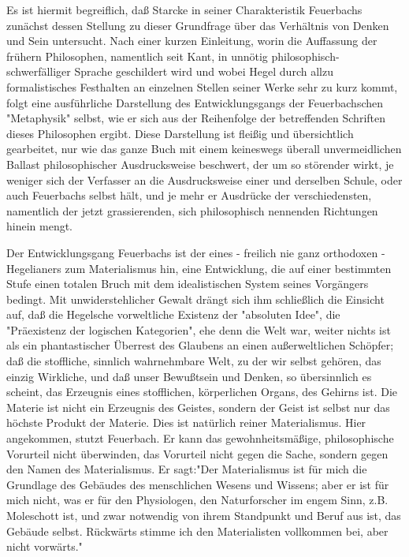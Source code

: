 Es ist hiermit begreiflich, daß Starcke in seiner Charakteristik
Feuerbachs zunächst dessen Stellung zu dieser Grundfrage über das
Verhältnis von Denken und Sein untersucht. Nach einer kurzen Einleitung,
worin die Auffassung der frühern Philosophen, namentlich seit Kant, in
unnötig philosophisch-schwerfälliger Sprache geschildert wird und wobei
Hegel durch allzu formalistisches Festhalten an einzelnen Stellen seiner
Werke sehr zu kurz kommt, folgt eine ausführliche Darstellung des
Entwicklungsgangs der Feuerbachschen "Metaphysik" selbst, wie er sich
aus der Reihenfolge der betreffenden Schriften dieses Philosophen
ergibt. Diese Darstellung ist fleißig und übersichtlich gearbeitet, nur
wie das ganze Buch mit einem keineswegs überall unvermeidlichen Ballast
philosophischer Ausdrucksweise beschwert, der um so störender wirkt, je
weniger sich der Verfasser an die Ausdrucksweise einer und derselben
Schule, oder auch Feuerbachs selbst hält, und je mehr er Ausdrücke der
verschiedensten, namentlich der jetzt grassierenden, sich philosophisch
nennenden Richtungen hinein mengt.

Der Entwicklungsgang Feuerbachs ist der eines - freilich nie
ganz orthodoxen - Hegelianers zum Materialismus hin, eine Entwicklung,
die auf einer bestimmten Stufe einen totalen Bruch mit dem
idealistischen System seines Vorgängers bedingt. Mit unwiderstehlicher
Gewalt drängt sich ihm schließlich die Einsicht auf, daß die Hegelsche
vorweltliche Existenz der "absoluten Idee", die "Präexistenz der
logischen Kategorien", ehe denn die Welt war, weiter nichts ist als ein
phantastischer Überrest des Glaubens an einen außerweltlichen Schöpfer;
daß die stoffliche, sinnlich wahrnehmbare Welt, zu der wir selbst
gehören, das einzig Wirkliche, und daß unser Bewußtsein und Denken, so
übersinnlich es scheint, das Erzeugnis eines stofflichen, körperlichen
Organs, des Gehirns ist. Die Materie ist nicht ein Erzeugnis des
Geistes, sondern der Geist ist selbst nur das höchste Produkt der
Materie. Dies ist natürlich reiner Materialismus. Hier angekommen,
stutzt Feuerbach. Er kann das gewohnheitsmäßige, philosophische
Vorurteil nicht überwinden, das Vorurteil nicht gegen die Sache, sondern
gegen den Namen des Materialismus. Er sagt:"Der Materialismus ist für
mich die Grundlage des Gebäudes des menschlichen Wesens und Wissens;
aber er ist für mich nicht, was er für den Physiologen, den
Naturforscher im engem Sinn, z.B. Moleschott ist, und zwar notwendig von
ihrem Standpunkt und Beruf aus ist, das Gebäude selbst. Rückwärts stimme
ich den Materialisten vollkommen bei, aber nicht vorwärts."

